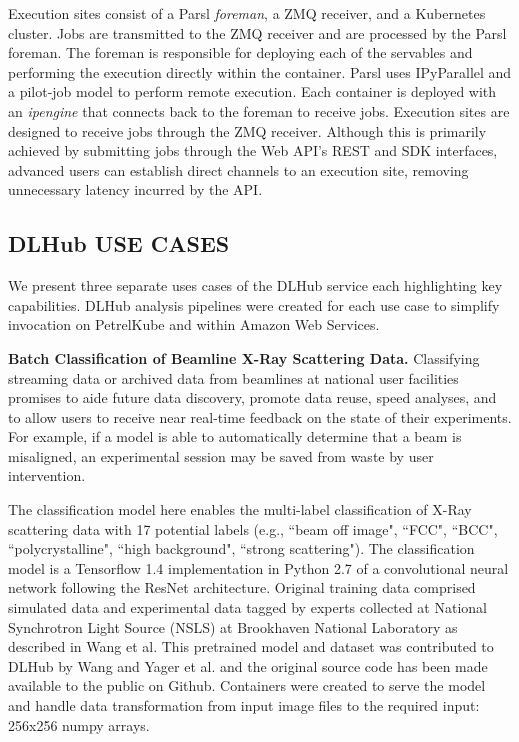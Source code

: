 \documentclass{aip-cp}
\newcommand\ben[1]{}
\newcommand\ben[1]{{\color{blue}[Ben: #1]}}
\begin{document}
Execution sites consist of a Parsl \textit{foreman}, a ZMQ receiver, and a Kubernetes cluster. Jobs 
are transmitted to the ZMQ receiver and are processed by the Parsl foreman. The foreman is 
responsible for deploying each of the servables and 
performing the execution directly within the container. Parsl uses IPyParallel and a pilot-job 
model to perform remote execution. Each container is deployed with an \textit{ipengine} that 
connects back to the foreman to receive jobs. Execution sites are designed to receive jobs through 
the ZMQ receiver. Although this is primarily achieved by submitting jobs through the Web API's REST 
and SDK interfaces, advanced users can establish direct channels to an execution site, removing 
unnecessary latency incurred by the API.



\subsection{DLHub USE CASES}
We present three separate uses cases of the DLHub service each highlighting
key capabilities. DLHub analysis pipelines were created for each
use case to simplify invocation on PetrelKube and within Amazon Web Services.
\ben{refine and add based on other paper components and DLHub architecture section}

\textbf{Batch Classification of Beamline X-Ray Scattering Data.}
Classifying streaming data or archived data from beamlines at national user
facilities promises to aide future data discovery, promote data reuse, speed
analyses, and to allow users to receive near real-time feedback on the state
of their experiments. For example, if a model is able to automatically
determine that a beam is misaligned, an experimental session may be saved from
waste by user intervention.

The classification model here enables the multi-label classification of X-Ray
scattering data with 17 potential labels (e.g., ``beam off image", ``FCC",
``BCC", ``polycrystalline", ``high background", ``strong scattering"). The
classification model is a Tensorflow 1.4 implementation in Python 2.7 of a
convolutional neural network following the ResNet architecture. Original
training data comprised simulated data and experimental data tagged by experts
collected at National Synchrotron Light Source (NSLS) at Brookhaven National
Laboratory as described in Wang et al. This pretrained model and dataset was
contributed to DLHub by Wang and Yager et al. and the original source code has
been made available to the public on Github. Containers were created to serve
the model and handle data transformation from input image files to the
required input: 256x256 numpy arrays.
\end{document}
